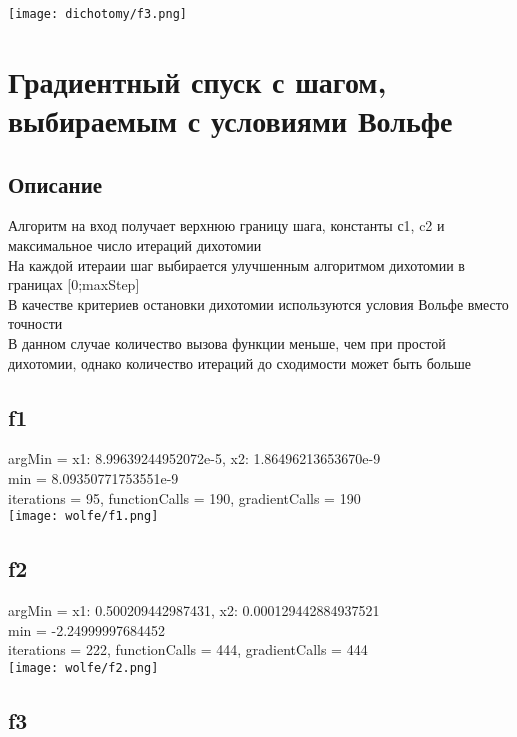 \documentclass{article}
\begin{document}
\texttt{[image: dichotomy/f3.png]} \\

\section{Градиентный спуск с шагом, выбираемым с условиями Вольфе}

\subsection{Описание}
Алгоритм на вход получает верхнюю границу шага, константы с1, c2 и максимальное число итераций дихотомии \\
На каждой итераии шаг выбирается улучшенным алгоритмом дихотомии в границах [0;maxStep] \\
В качестве критериев остановки дихотомии используются условия Вольфе вместо точности \\
В данном случае количество вызова функции меньше, чем при простой дихотомии, однако количество итераций до сходимости может быть больше

\subsection{f1}

argMin = {x1: 8.99639244952072e-5, x2: 1.86496213653670e-9} \\
min =  8.09350771753551e-9 \\
iterations =  95, functionCalls =  190, gradientCalls =  190 \\

\texttt{[image: wolfe/f1.png]} \\

\subsection{f2}

argMin = {x1: 0.500209442987431, x2: 0.000129442884937521} \\
min =  -2.24999997684452 \\
iterations =  222, functionCalls =  444, gradientCalls =  444 \\

\texttt{[image: wolfe/f2.png]} \\

\subsection{f3}
\end{document}
